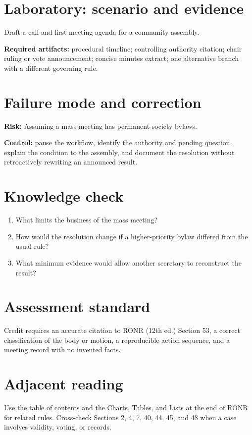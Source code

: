 \documentclass[11pt]{article}
\begin{document}
\section{Laboratory: scenario and evidence}
Draft a call and first-meeting agenda for a community assembly.

\textbf{Required artifacts:} procedural timeline; controlling authority citation; chair ruling or vote announcement; concise minutes extract; one alternative branch with a different governing rule.

\section{Failure mode and correction}
\textbf{Risk:} Assuming a mass meeting has permanent-society bylaws.

\textbf{Control:} pause the workflow, identify the authority and pending question, explain the condition to the assembly, and document the resolution without retroactively rewriting an announced result.

\section{Knowledge check}
\begin{enumerate}[leftmargin=*,itemsep=4pt]
\item What limits the business of the mass meeting?
\item How would the resolution change if a higher-priority bylaw differed from the usual rule?
\item What minimum evidence would allow another secretary to reconstruct the result?
\end{enumerate}

\section{Assessment standard}
Credit requires an accurate citation to RONR (12th ed.) Section 53, a correct classification of the body or motion, a reproducible action sequence, and a meeting record with no invented facts.

\section{Adjacent reading}
Use the table of contents and the Charts, Tables, and Lists at the end of RONR for related rules. Cross-check Sections 2, 4, 7, 40, 44, 45, and 48 when a case involves validity, voting, or records.
\end{document}
